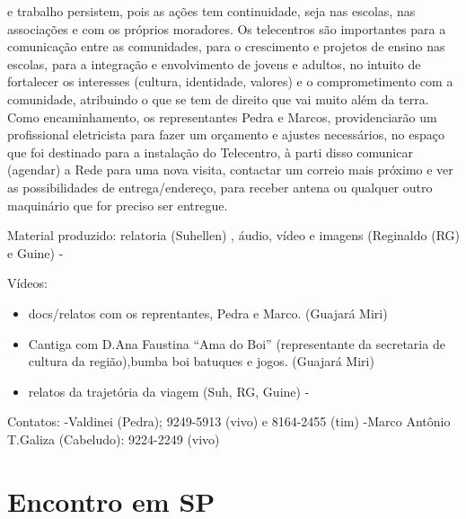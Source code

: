 \documentclass[a4paper, 11pt, oneside]{Relatorio_sem}  %
\begin{document}
\begin{description}
    e trabalho persistem, pois as ações tem continuidade, seja nas
    escolas, nas associações e com os próprios moradores. Os
    telecentros são importantes para a comunicação entre as
    comunidades, para o crescimento e projetos de ensino nas escolas,
    para a integração e envolvimento de jovens e adultos, no intuito
    de fortalecer os interesses (cultura, identidade, valores) e o
    comprometimento com a comunidade, atribuindo o que se tem de
    direito que vai muito além da terra.  Como encaminhamento, os
    representantes Pedra e Marcos, providenciarão um profissional
    eletricista para fazer um orçamento e ajustes necessários, no
    espaço que foi destinado para a instalação do Telecentro, à parti
    disso comunicar (agendar) a Rede para uma nova visita, contactar
    um correio mais próximo e ver as possibilidades de
    entrega/endereço, para receber antena ou qualquer outro maquinário
    que for preciso ser
    entregue.
\end{description}

Material produzido: 
relatoria (Suhellen) ,
áudio, vídeo e imagens (Reginaldo (RG) e Guine) - 

Vídeos: 
\begin{itemize}
 \item docs/relatos com os reprentantes, Pedra e Marco. (Guajará Miri)
 \item Cantiga com D.Ana Faustina ``Ama do Boi'' (representante da
   secretaria de cultura da região),bumba boi batuques e
   jogos. (Guajará Miri)
 \item relatos da trajetória da viagem (Suh, RG, Guine) -
\end{itemize}


Contatos: -Valdinei (Pedra); 9249-5913 (vivo) e 8164-2455 (tim) -Marco
Antônio T.Galiza (Cabeludo): 9224-2249 (vivo)




\chapter{Encontro em SP}







\clearpage  %

\pagestyle{empty}  %
\end{document}
